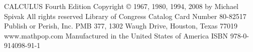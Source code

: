 CALCULUS
Fourth Edition
Copyright \copyright{} 1967, 1980, 1994, 2008 by Michael Spivak
All rights reserved
Library of Congress Catalog Card Number 80-82517
Publish or Perish, Inc.
PMB 377, 1302 Waugh Drive,
Houston, Texas 77019
www.mathpop.com
Manufactured in the United States of America
ISBN 978-0-914098-91-1